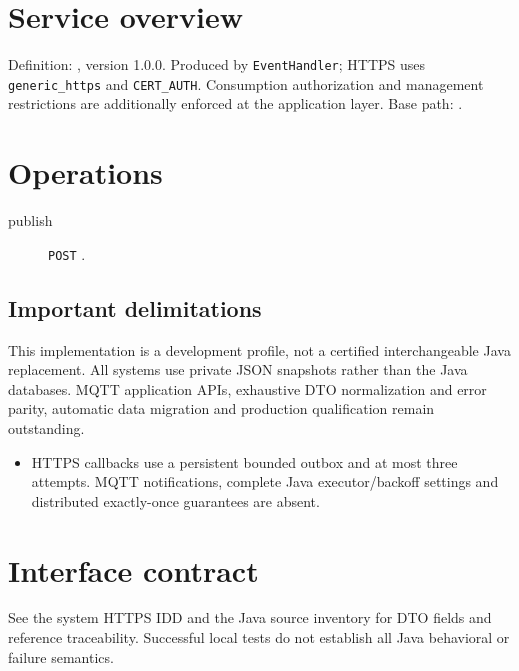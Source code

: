 \documentclass[a4paper]{arrowhead}
\begin{document}
\ArrowheadSetup
\section{Service overview}
Definition: , version 1.0.0. Produced by \texttt{EventHandler}; HTTPS uses \texttt{generic\_https} and \texttt{CERT\_AUTH}. Consumption authorization and management restrictions are additionally enforced at the application layer. Base path: .
\section{Operations}
\begin{description}
\item[publish] \texttt{POST} .
\end{description}
\subsection{Important delimitations}
This implementation is a development profile, not a certified interchangeable Java replacement. All systems use private JSON snapshots rather than the Java databases. MQTT application APIs, exhaustive DTO normalization and error parity, automatic data migration and production qualification remain outstanding.
\begin{itemize}
\item HTTPS callbacks use a persistent bounded outbox and at most three attempts. MQTT notifications, complete Java executor/backoff settings and distributed exactly-once guarantees are absent.
\end{itemize}
\section{Interface contract}
See the system HTTPS IDD and the Java source inventory for DTO fields and reference traceability. Successful local tests do not establish all Java behavioral or failure semantics.
\end{document}
